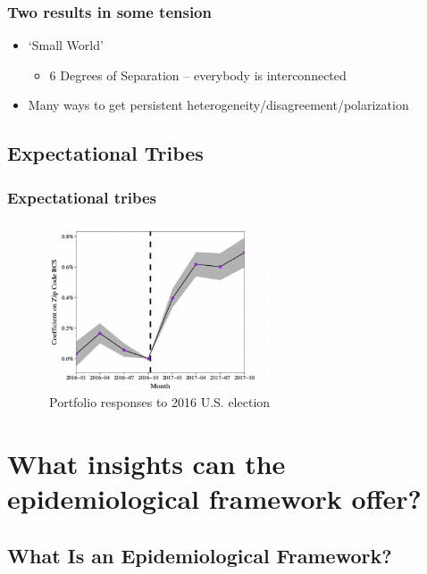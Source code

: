 \documentclass[pdflatex]{beamer}
\begin{document}
\begin{frame}\frametitle{Two results in some tension}

    \begin{itemize}
        \item `Small World'
        \begin{itemize}
            \item 6 Degrees of Separation -- everybody is interconnected
        \end{itemize}
        \item Many ways to get persistent heterogeneity/disagreement/polarization
    \end{itemize}

\end{frame}

\subsection{Expectational Tribes}\label{subsec:ExpTribes}

\begin{frame}
		\frametitle{Expectational tribes}
\begin{figure}[!ht] \centering  %
	\caption{ ~Portfolio responses to 2016 U.S. election}
	\label{fig:parker}
	\centerline{\includegraphics[width=0.6\textwidth]{./figures/parker}}
\end{figure}
\end{frame}
\section{What insights can the epidemiological framework
	offer?}\label{what-insights-can-the-epidemiological-framework-offer}



\subsection{What Is an Epidemiological Framework?}
\label{subsec: epi_framework}
\end{document}
